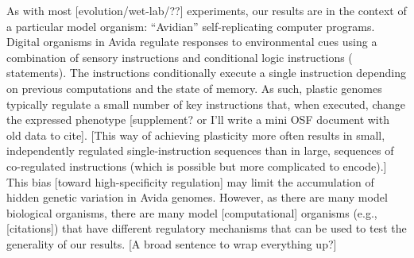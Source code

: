 As with most [evolution/wet-lab/??] experiments, our results are in the context of a particular model organism: ``Avidian'' self-replicating computer programs.
Digital organisms in Avida regulate responses to environmental cues using a combination of sensory instructions and conditional logic instructions ( statements).
The  instructions conditionally execute a single instruction depending on previous computations and the state of memory.  
As such, plastic genomes typically regulate a small number of key instructions that, when executed, change the expressed phenotype [supplement? or I'll write a mini OSF document with old data to cite].
[This way of achieving plasticity more often results in 
small, independently regulated single-instruction sequences 
than in
large, sequences of co-regulated instructions (which is possible but more complicated to encode).]
This bias [toward high-specificity regulation] may limit the accumulation of hidden genetic variation in Avida genomes. 
However, as there are many model biological organisms, there are many model [computational] organisms (e.g., [citations]) that have different regulatory mechanisms that can be used to test the generality of our results.
[A broad sentence to wrap everything up?]

